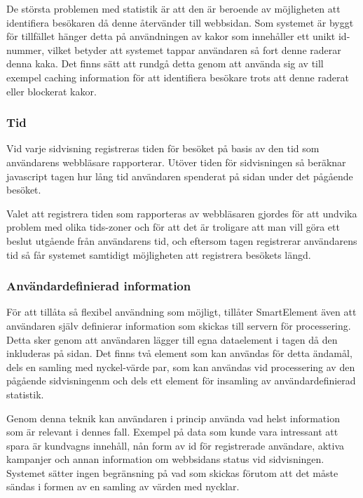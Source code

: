 De största problemen med statistik är att den är beroende av möjligheten att identifiera besökaren då denne återvänder till webbsidan. Som systemet är byggt för tillfället hänger detta på användningen av kakor som innehåller ett unikt id-nummer, vilket betyder att systemet tappar användaren så fort denne raderar denna kaka. Det finns sätt att rundgå detta genom att använda sig av till exempel caching information för att identifiera besökare trots att denne raderat eller blockerat kakor. \citep{ashkanblog}



\subsubsection{Tid}

Vid varje sidvisning registreras tiden för besöket på basis av den tid som användarens webbläsare rapporterar. Utöver tiden för sidvisningen så beräknar javascript tagen hur lång tid användaren spenderat på sidan under det pågående besöket.

Valet att registrera tiden som rapporteras av webbläsaren gjordes för att undvika problem med olika tids-zoner och för att det är troligare att man vill göra ett beslut utgående från användarens tid, och eftersom tagen registrerar användarens tid så får systemet samtidigt möjligheten att registrera besökets längd.

\subsubsection{Användardefinierad information}

För att tillåta så flexibel användning som möjligt, tillåter SmartElement även att användaren själv definierar information som skickas till servern för processering. Detta sker genom att användaren lägger till egna dataelement i tagen då den inkluderas på sidan. Det finns två element som kan användas för detta ändamål, dels en samling med nyckel-värde par, som kan användas vid processering av den pågående sidvisningenm och dels ett element för insamling av användardefinierad statistik.

Genom denna teknik kan användaren i princip använda vad helst information som är relevant i dennes fall. Exempel på data som kunde vara intressant att spara är kundvagns innehåll, nån form av id för registrerade användare, aktiva kampanjer och annan information om webbsidans status vid sidvisningen. Systemet sätter ingen begränsning på vad som skickas förutom att det måste sändas i formen av en samling av värden med nycklar.

